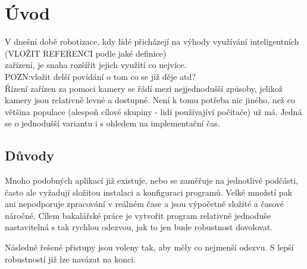 \chapter{Úvod}
V dnešní době robotizace, kdy lidé přicházejí na výhody využívání inteligentních \\(VLOŽIT REFERENCI podle jaké definice)\\ zařízení, je snaha rozšířit jejich využití co nejvíce. \\POZN:vložit delší povídání o tom co se již děje atd?\\
Řízení zařízen za pomoci kamery se řádí mezi nejjednodušší způsoby, jelikož kamery jsou relativně levné a dostupné. Není k tomu potřeba nic jiného, než co většina populace (alespoň cílové skupiny - lidí používajíví počítače) už má. Jedná se o jednodušší variantu i s ohledem na implementační čas.


\section{Důvody}
Mnoho podobných aplikací již existuje, nebo se zaměřuje na jednotlivé podčásti, často ale vyžadují složitou instalaci a konfiguraci programů. Velké množstí pak ani nepodporuje zpracování v reálném čase a jsou výpočetně složité a časové náročné. Cílem bakalářské práce je vytvořit program relativně jednoduše nastavitelná s tak rychlou odezvou, jak to jen bude robustnost dovolovat.

Následně řešené přistupy jsou voleny tak, aby měly co nejmenší odezvu. S lepší robustností již lze navázat na konci. %

\endinput